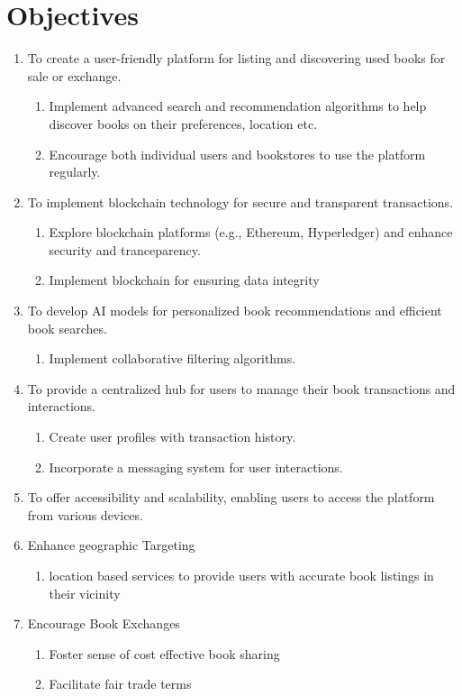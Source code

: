 \documentclass{article}
\begin{document}
\section{Objectives}
\begin{enumerate}
    \item To create a user-friendly platform for listing and discovering used books for sale or exchange.
      \begin{enumerate}
          \item Implement advanced search and recommendation algorithms to help discover books on their preferences, location etc.
          \item Encourage both individual users and bookstores to use the platform regularly.
      \end{enumerate}
    \item To implement blockchain technology for secure and transparent transactions.
      \begin{enumerate}
          \item Explore blockchain platforms (e.g., Ethereum, Hyperledger) and enhance security and tranceparency.
          \item Implement blockchain for ensuring data integrity
      \end{enumerate}
    \item To develop AI models for personalized book recommendations and efficient book searches.
      \begin{enumerate}
          \item Implement collaborative filtering algorithms.
      \end{enumerate}
    \item To provide a centralized hub for users to manage their book transactions and interactions.
      \begin{enumerate}
          \item Create user profiles with transaction history.
          \item Incorporate a messaging system for user interactions.
      \end{enumerate}
    \item To offer accessibility and scalability, enabling users to access the platform from various devices.
    \item Enhance geographic Targeting
      \begin{enumerate}
       \item location based services to provide users with accurate book listings in their vicinity
      \end{enumerate}
       \item Encourage Book Exchanges
      \begin{enumerate}
          \item Foster sense of cost effective book sharing
         \item Facilitate fair trade terms
      \end{enumerate}
  \end{enumerate}
\end{document}
